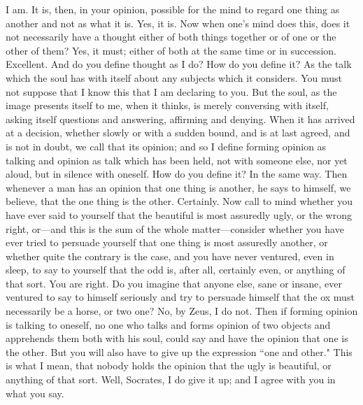 \documentclass[letterpaper,12pt]{article}
\newcommand{\stephpag}[1]{\marginnote{\small\itshape\fontfamily{ppl}\selectfont #1}}
\begin{document}
\begin{drama}
\theaetetusspeaks
I am.
\socratesspeaks
It is, then, in your opinion, possible for the mind to regard one thing as another and not as what it is.
\theaetetusspeaks
Yes, it is.
\socratesspeaks
Now when one's mind does this, does it not necessarily \stephpag{e} have a thought either of both things together or of one or the other of them?
\theaetetusspeaks
Yes, it must; either of both at the same time or in succession.
\socratesspeaks
Excellent. And do you define thought as I do?
\theaetetusspeaks
How do you define it?
\socratesspeaks
As the talk which the soul has with itself about any subjects which it considers. You must not suppose that I know this that I am declaring to you. But the soul, as the image presents itself to me, when it thinks, is merely conversing with itself, asking itself questions and answering, \stephpag{190 a} affirming and denying. When it has arrived at a decision, whether slowly or with a sudden bound, and is at last agreed, and is not in doubt, we call that its opinion; and so I define forming opinion as talking and opinion as talk which has been held, not with someone else, nor yet aloud, but in silence with oneself. How do you define it?
\theaetetusspeaks
In the same way.
\socratesspeaks
Then whenever a man has an opinion that one thing is another, he says to himself, we believe, that the one thing is the other. \stephpag{b}
\theaetetusspeaks
Certainly.
\socratesspeaks
Now call to mind whether you have ever said to yourself that the beautiful is most assuredly ugly, or the wrong right, or—and this is the sum of the whole matter—consider whether you have ever tried to persuade yourself that one thing is most assuredly another, or whether quite the contrary is the case, and you have never ventured, even in sleep, to say to yourself that the odd is, after all, certainly even, or anything of that sort.
\theaetetusspeaks
You are right. \stephpag{c}
\socratesspeaks
Do you imagine that anyone else, sane or insane, ever ventured to say to himself seriously and try to persuade himself that the ox must necessarily be a horse, or two one?
\theaetetusspeaks
No, by Zeus, I do not.
\socratesspeaks
Then if forming opinion is talking to oneself, no one who talks and forms opinion of two objects and apprehends them both with his soul, could say and have the opinion that one is the other. But you will also have to give up the expression ``one and other." This is what I mean, that nobody holds the opinion that the ugly is beautiful, or \stephpag{d} anything of that sort.
\theaetetusspeaks
Well, Socrates, I do give it up; and I agree with you in what you say.

\end{drama}
\end{document}
